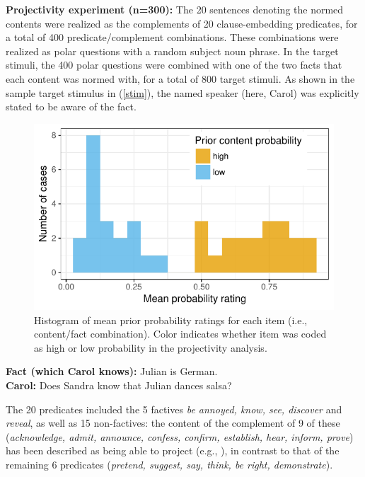 \documentclass[12pt,fleqn]{article}
\newcommand{\6}{\mbox{$[\hspace*{-.6mm}[$}}
\newcommand{\9}{\mbox{$]\hspace*{-.6mm}]$}}
\begin{document}
\noindent 
{\bf Projectivity experiment (n=300):} The 20 sentences denoting the normed contents were realized as the complements of 20 clause-embedding predicates, for a total of 400 predicate/complement combinations. These combinations were realized as polar questions with a random subject noun phrase. In the target stimuli, the 400 polar questions were combined with one of the two facts that each content was normed with, for a total of 800 target stimuli. As shown in the sample target stimulus in (\ref{stim}), the named speaker (here, Carol) was explicitly stated to be aware of the fact.
\vspace*{-.6cm}
\begin{figure}
\centering
\includegraphics[width=.32\paperwidth]{../results/1-prior/graphs/meanprobratings}
\caption{Histogram of mean prior probability ratings for each item (i.e., content/fact combination). Color indicates whether item was coded as high or low probability in the projectivity analysis.}\label{f-prior}
\end{figure}%
\begin{exe}
\ex\label{stim}
{\bf Fact (which Carol knows):} Julian is German.  \\ 
{\bf Carol:} Does Sandra know that Julian dances salsa?
\end{exe}
\vspace*{-.15cm}
The 20 predicates included the 5 factives {\em be annoyed, know, see, discover} and {\em reveal}, as well as 15 non-factives: the content of the complement of 9 of these ({\em acknowledge, admit, announce, confess, confirm, establish, hear, inform, prove}) has been described as being able to project (e.g., \citealt{schlenker10,anand-hacquard2014,spector-egre2015,tbd-variability}), in contrast to that of the remaining 6 predicates ({\em pretend, suggest, say, think, be right, demonstrate}).
\end{document}
